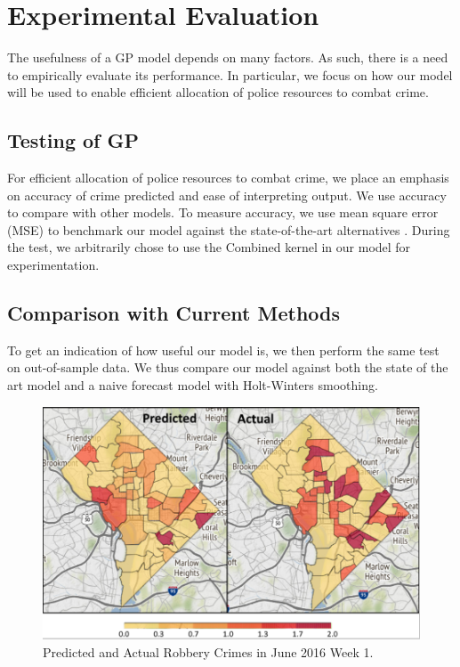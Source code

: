 \documentclass[letterpaper]{article}
\begin{document}
	\section{Experimental Evaluation}
	The usefulness of a GP model depends on many factors. As such, there is a need to empirically evaluate its performance.
	In particular, we focus on how our model will be used to enable efficient allocation of police resources to combat crime.

	\subsection{Testing of GP}
	For efficient allocation of police resources to combat crime, we place an emphasis on accuracy of crime predicted and ease of interpreting output. 
	We use accuracy to compare with other models. To measure accuracy, we use mean square error (MSE) to benchmark our model against the state-of-the-art alternatives \autocite{c06}. During the test, we arbitrarily chose to use the Combined kernel in our model for experimentation.

	\subsection{Comparison with Current Methods}
	
	To get an indication of how useful our model is, we then perform the same test on out-of-sample data.
	We thus compare our model against both the state of the art model and a naive forecast model with Holt-Winters smoothing.
	
	\begin{figure}[!ht]
		\includegraphics[width=\linewidth]{./p2.png}
		\caption{Predicted and Actual Robbery Crimes in June 2016 Week 1.}
		\label{p2}
	\end{figure}
\end{document}

